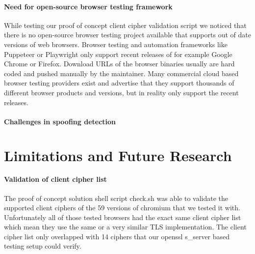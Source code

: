 \documentclass[12pt]{scrbook}
\begin{document}
\paragraph{Need for open-source browser testing framework}
While testing our proof of concept client cipher validation script we noticed that there is no
open-source browser testing project available that supports out of date versions of web browsers.
Browser testing and automation frameworks like Puppeteer or Playwright only support recent releases
of for example Google Chrome or Firefox. Download URLs of the browser binaries usually are hard coded
and pushed manually by the maintainer. Many commercial cloud based browser testing providers exist and
advertise that they support thousands of different browser products and versions, but in reality only support
the recent releases.

\paragraph{Challenges in spoofing detection}

\section{Limitations and Future Research}

\paragraph{Validation of client cipher list}
The proof of concept solution shell script check.sh was able to validate the
supported client ciphers of the 59 versions of chromium that we tested it with.
Unfortunately all of those tested browsers had the exact same client cipher list
which mean they use the same or a very similar TLS implementation. The client cipher list only
overlapped with 14 ciphers that our openssl s\_server based testing setup could
verify.

\newpage  
\end{document}
